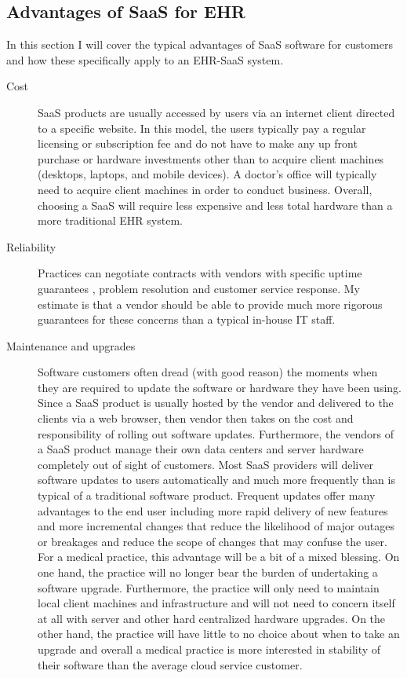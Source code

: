 \documentclass[10pt]{article}
\begin{document}
\subsection{Advantages of SaaS for EHR}
\label{sec:SaaS Adantages}

In this section I will cover the typical advantages of SaaS software for customers and how these specifically apply to an EHR-SaaS system.

\begin{description}
\item[Cost]
SaaS products are usually accessed by users via an internet client directed to a specific website.
In this model, the users typically pay a regular licensing or subscription fee and do not have to make any up front purchase or hardware investments other than to acquire client machines (desktops, laptops, and mobile devices). 
A doctor's office will typically need to acquire client machines in order to conduct business. Overall, choosing a SaaS will require less expensive and less total hardware than a more traditional EHR system.

\item[Reliability]
Practices can negotiate contracts with vendors with specific uptime guarantees \cite{wiki-saas}, problem resolution and customer service response.
My estimate is that a vendor should be able to provide much more rigorous guarantees for these concerns than a typical in-house IT staff.

\item[Maintenance and upgrades]
Software customers often dread (with good reason) the moments when they are required to update the software or hardware they have been using.
Since a SaaS product is usually hosted by the vendor and delivered to the clients via a web browser, then vendor then takes on the cost and responsibility of rolling out software updates.
Furthermore, the vendors of a SaaS product manage their own data centers and server hardware completely out of sight of customers.
Most SaaS providers will deliver software updates to users automatically and much more frequently than is typical of a traditional software product.
Frequent updates offer many advantages to the end user including more rapid delivery of new features and more incremental changes that reduce the likelihood of major outages or breakages and reduce the scope of changes that may confuse the user.
For a medical practice, this advantage will be a bit of a mixed blessing.
On one hand, the practice will no longer bear the burden of undertaking a software upgrade.
Furthermore, the practice will only need to maintain local client machines and infrastructure and will not need to concern itself at all with server and other hard centralized hardware upgrades.
On the other hand, the practice will have little to no choice about when to take an upgrade and overall a medical practice is more interested in stability of their software than the average cloud service customer.


\end{description}
\end{document}
